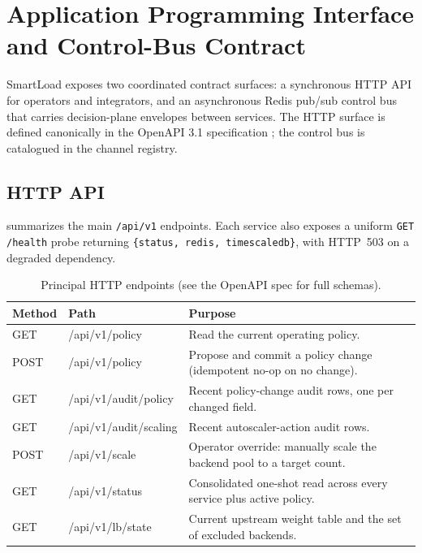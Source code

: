 \chapter{Application Programming Interface and Control-Bus Contract}
\label{bm:app-api}

SmartLoad exposes two coordinated contract surfaces: a synchronous HTTP API for
operators and integrators, and an asynchronous Redis pub/sub control bus that
carries decision-plane envelopes between services. The HTTP surface is defined
canonically in the OpenAPI 3.1 specification \cite{openapi}; the control bus is
catalogued in the channel registry.

\section{HTTP API}
\label{bm:sec-http}

 summarizes the main \texttt{/api/v1} endpoints. Each
service also exposes a uniform \texttt{GET /health} probe returning
\texttt{\{status, redis, timescaledb\}}, with HTTP~503 on a degraded
dependency.

\begin{table}[htbp]
  \centering
  \caption[Principal HTTP endpoints]{Principal HTTP endpoints (see the OpenAPI spec for full schemas).}
  \label{bm:tab-api}
  \small
  \begin{tabularx}{\linewidth}{@{}l l Y@{}}
    \toprule
    \textbf{Method} & \textbf{Path} & \textbf{Purpose} \\
    \midrule
    GET  & /api/v1/policy          & Read the current operating policy. \\
    POST & /api/v1/policy          & Propose and commit a policy change (idempotent no-op on no change). \\
    GET  & /api/v1/audit/policy    & Recent policy-change audit rows, one per changed field. \\
    GET  & /api/v1/audit/scaling   & Recent autoscaler-action audit rows. \\
    POST & /api/v1/scale           & Operator override: manually scale the backend pool to a target count. \\
    GET  & /api/v1/status          & Consolidated one-shot read across every service plus active policy. \\
    GET  & /api/v1/lb/state        & Current upstream weight table and the set of excluded backends. \\
    \bottomrule
  \end{tabularx}
\end{table}

